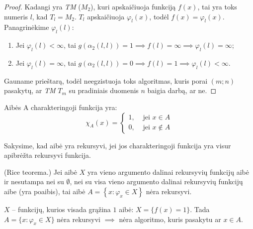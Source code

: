 \begin{prop}
\begin{proof}
    Kadangi yra \emph{TM} ($M_{2}$), kuri apskaičiuoja funkciją $f(x)$,
    tai yra toks numeris $l$, kad $T_{l} = M_{2}$. $T_{l}$ apskaičiuoja
    $\varphi_{l}(x)$, todėl $f(x) = \varphi_{l}(x)$. Panagrinėkime 
    $\varphi_{l}(l)$:
    \begin{enumerate}
      \item Jei $\varphi_{l}(l) < \infty$, tai 
        $g(\alpha_{2}(l,l)) = 1 \implies f(l) = \infty \implies%
        \varphi_{l}(l) = \infty$;
      \item Jei $\varphi_{l}(l) = \infty$, tai 
        $g(\alpha_{2}(l,l)) = 0 \implies f(l) = 1 \implies%
        \varphi_{l}(l) < \infty$.
    \end{enumerate}
    Gauname prieštarą, todėl neegzistuoja toks algoritmas, kuris 
    porai $(m;n)$ pasakytų, ar \emph{TM} $T_{m}$ su pradiniais duomenis
    $n$ baigia darbą, ar ne.
  \end{proof}
\end{prop}

\begin{defn}
  Aibės A charakteringoji funkcija yra:
  \[
  \chi _{A}(x) =%
  \begin{cases}
    1, & \text{ jei } x \in A \\
    0, & \text{ jei } x \not \in A
  \end{cases}
  \]
\end{defn}

\begin{defn}
  Sakysime, kad aibė yra rekursyvi, jei jos charakteringoji funkcija yra
  visur apibrėžta rekursyvi funkcija.
\end{defn}

\begin{note}
  (Rice teorema.) Jei aibė $X$ yra vieno argumento dalinai rekursyvių
  funkcijų aibė ir nesutampa nei su $\emptyset$, nei su visa vieno
  argumento dalinai rekursyvių funkcijų aibe (yra poaibis), tai 
  aibė $A = \left\{ x : \varphi_{x} \in X \right\}$ nėra rekursyvi.
  \begin{exmp}
    $X$ – funkcijų, kurios visada grąžina $1$ aibė: $X = \{ f(x) = 1 \}$.
    Tada $A = \{ x : \varphi_{x} \in X \}$ nėra rekursyvi $\implies$
    nėra algoritmo, kuris pasakytu ar $x \in A$.
  \end{exmp}
\end{note}

